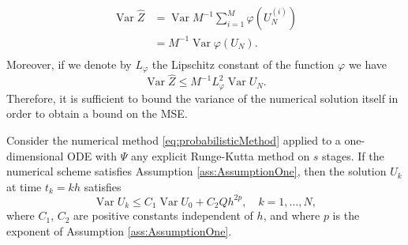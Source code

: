\documentclass{siamart1116}
\numberwithin{theorem}{section}
\renewcommand{\phi}{\varphi}
\newcommand{\Var}{\operatorname{Var}}
\newcommand{\sksum}{\textstyle\sum}
\begin{document}
\begin{equation}
\begin{aligned}
	\Var\hat Z &= \Var M^{-1} \sksum_{i = 1}^M \phi(U_N^{(i)}) \\
	&= M^{-1} \Var\phi\left(U_N\right). \\
\end{aligned}
\end{equation}
Moreover, if we denote by $L_\phi$ the Lipschitz constant of the function $\phi$ we have
\begin{equation}\label{eq:BoundOfVarHatZ}
	\Var\hat Z \leq M^{-1} L_\phi^2 \Var U_N.
\end{equation}
Therefore, it is sufficient to bound the variance of the numerical solution itself in order to obtain a bound on the MSE.
\begin{lemma}\label{lem:VarianceExplicit} Consider the numerical method \eqref{eq:probabilisticMethod} applied to a one-dimensional ODE with $\Psi$ any explicit Runge-Kutta method on $s$ stages. If the numerical scheme satisfies Assumption \ref{ass:AssumptionOne}, then the solution $U_k$ at time $t_k = kh$ satisfies
\begin{equation}
	\Var U_k \leq C_1\Var U_0 + C_2Q h^{2p}, \quad k = 1, \ldots, N,
\end{equation}
where $C_1$, $C_2$ are positive constants independent of $h$, and where $p$ is the exponent of Assumption \ref{ass:AssumptionOne}.
\end{lemma}
\end{document}
